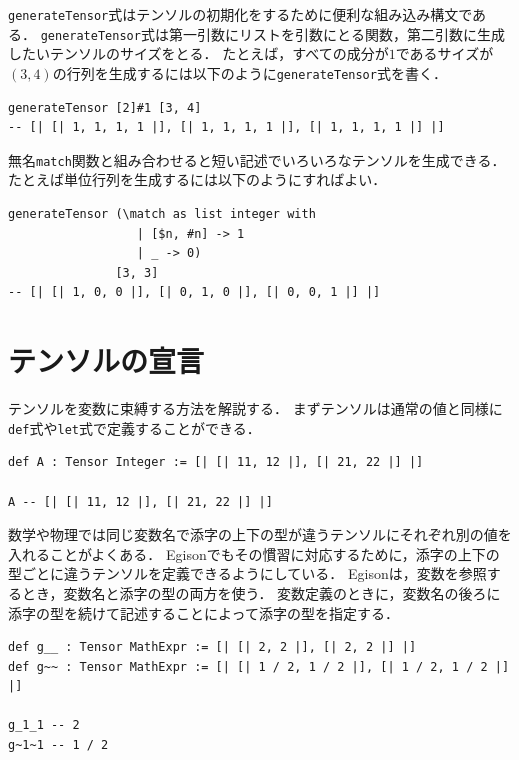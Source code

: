 \lstinline{generateTensor}式はテンソルの初期化をするために便利な組み込み構文である．
\lstinline{generateTensor}式は第一引数にリストを引数にとる関数，第二引数に生成したいテンソルのサイズをとる．
たとえば，すべての成分が$1$であるサイズが$(3, 4)$の行列を生成するには以下のように\lstinline{generateTensor}式を書く．
\begin{lstlisting}[language=egison,numbers=none]
generateTensor [2]#1 [3, 4]
-- [| [| 1, 1, 1, 1 |], [| 1, 1, 1, 1 |], [| 1, 1, 1, 1 |] |]
\end{lstlisting}

無名\lstinline{match}関数と組み合わせると短い記述でいろいろなテンソルを生成できる．
たとえば単位行列を生成するには以下のようにすればよい．
\begin{lstlisting}[language=egison,numbers=none]
generateTensor (\match as list integer with
                  | [$n, #n] -> 1
                  | _ -> 0)
               [3, 3]
-- [| [| 1, 0, 0 |], [| 0, 1, 0 |], [| 0, 0, 1 |] |]
\end{lstlisting}

\section{テンソルの宣言}

テンソルを変数に束縛する方法を解説する．
まずテンソルは通常の値と同様に\lstinline{def}式や\lstinline{let}式で定義することができる．
\begin{lstlisting}[language=egison,numbers=none]
def A : Tensor Integer := [| [| 11, 12 |], [| 21, 22 |] |]

A -- [| [| 11, 12 |], [| 21, 22 |] |]
\end{lstlisting}

数学や物理では同じ変数名で添字の上下の型が違うテンソルにそれぞれ別の値を入れることがよくある．
Egisonでもその慣習に対応するために，添字の上下の型ごとに違うテンソルを定義できるようにしている．
Egisonは，変数を参照するとき，変数名と添字の型の両方を使う．
変数定義のときに，変数名の後ろに添字の型を続けて記述することによって添字の型を指定する．
\begin{lstlisting}[language=egison,numbers=none]
def g__ : Tensor MathExpr := [| [| 2, 2 |], [| 2, 2 |] |]
def g~~ : Tensor MathExpr := [| [| 1 / 2, 1 / 2 |], [| 1 / 2, 1 / 2 |] |]

g_1_1 -- 2
g~1~1 -- 1 / 2
\end{lstlisting}

